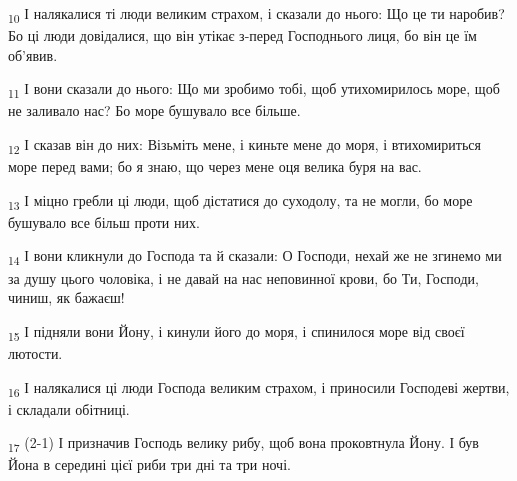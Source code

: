 \begin{tcolorbox}
\textsubscript{10} І налякалися ті люди великим страхом, і сказали до нього: Що це ти наробив? Бо ці люди довідалися, що він утікає з-перед Господнього лиця, бо він це їм об'явив.
\end{tcolorbox}
\begin{tcolorbox}
\textsubscript{11} І вони сказали до нього: Що ми зробимо тобі, щоб утихомирилось море, щоб не заливало нас? Бо море бушувало все більше.
\end{tcolorbox}
\begin{tcolorbox}
\textsubscript{12} І сказав він до них: Візьміть мене, і киньте мене до моря, і втихомириться море перед вами; бо я знаю, що через мене оця велика буря на вас.
\end{tcolorbox}
\begin{tcolorbox}
\textsubscript{13} І міцно гребли ці люди, щоб дістатися до суходолу, та не могли, бо море бушувало все більш проти них.
\end{tcolorbox}
\begin{tcolorbox}
\textsubscript{14} І вони кликнули до Господа та й сказали: О Господи, нехай же не згинемо ми за душу цього чоловіка, і не давай на нас неповинної крови, бо Ти, Господи, чиниш, як бажаєш!
\end{tcolorbox}
\begin{tcolorbox}
\textsubscript{15} І підняли вони Йону, і кинули його до моря, і спинилося море від своєї лютости.
\end{tcolorbox}
\begin{tcolorbox}
\textsubscript{16} І налякалися ці люди Господа великим страхом, і приносили Господеві жертви, і складали обітниці.
\end{tcolorbox}
\begin{tcolorbox}
\textsubscript{17} (2-1) І призначив Господь велику рибу, щоб вона проковтнула Йону. І був Йона в середині цієї риби три дні та три ночі.
\end{tcolorbox}
